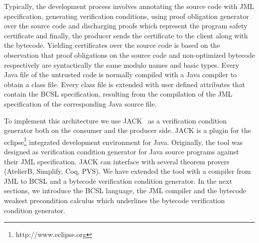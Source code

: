 Typically, the development process involves annotating the source code with JML specification, generating verification conditions, using proof obligation generator over the source code and 
discharging proofs which represent the program safety certificate and finally, the producer sends the certificate 
to the client along with the bytecode.
 Yielding certificates over the source code is based on the observation that
 proof obligations on the source code and non-optimized bytecode respectively
 are syntactically the same modulo names and basic types. Every Java file of the 
untrusted code is normally compiled with a Java compiler to obtain a class file. Every class file is extended with
 user defined attributes that contain the BCSL specification, resulting from the compilation of the
 JML specification of the corresponding Java source file.



    





To implement this architecture we use JACK~\cite{BRL-JACK} as a verification condition generator both on the consumer and the
producer side. JACK is a plugin for the eclipse\footnote{http://www.eclipse.org} integrated development environment for Java.
 Originally, the tool was designed as verification condition generator for Java source programs against their JML specification.
 JACK can interface with several theorem provers (AtelierB, Simplify, Coq, PVS). We have extended the tool with a compiler from
 JML to BCSL and a bytecode verification condition generator. In the next sections, we introduce
 the BCSL language, the JML compiler and the bytecode weakest precondition calculus which underlines the bytecode verification condition generator.
 
